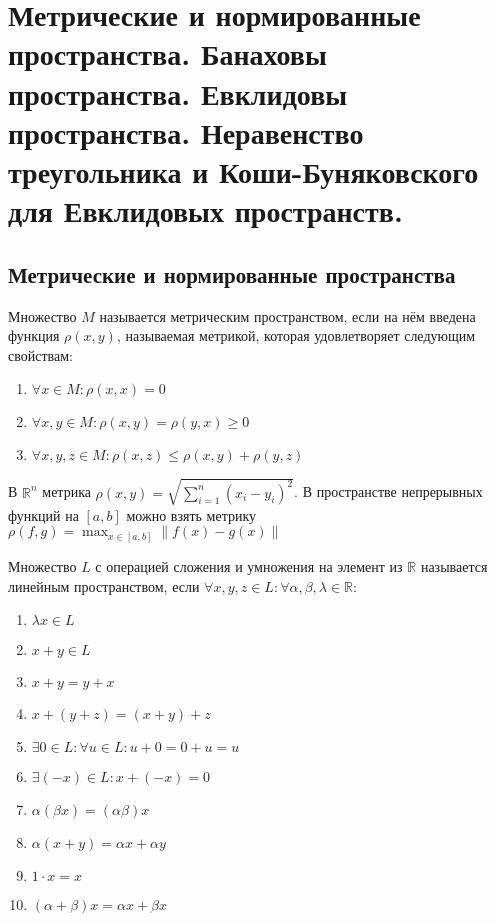 \documentclass[document.tex]{subfiles}
\begin{document}
\section{Метрические и нормированные пространства. Банаховы пространства. Евклидовы пространства. Неравенство
треугольника и Коши-Буняковского для Евклидовых пространств.}

\subsection{Метрические и нормированные пространства}
\begin{definition}
    Множество $M$ называется метрическим пространством, если на нём введена функция $\rho(x, y)$, называемая метрикой,
    которая удовлетворяет следующим свойствам:
    ~\begin{enumerate}
        \item $\forall x \in M: \rho(x, x) = 0$
        \item $\forall x, y \in M: \rho(x, y) = \rho(y, x) \geq 0$
        \item $\forall x, y, z \in M: \rho(x, z) \leq \rho(x, y) + \rho(y, z)$
    \end{enumerate}
\end{definition}

\begin{example}
    В $\mathbb{R}^n$ метрика $\rho(x, y) = \sqrt{\sum_{i = 1}^n (x_i - y_i)^2}$. В пространстве непрерывных функций на
    $[a, b]$ можно взять метрику $\rho(f, g) = \max_{x \in [a, b]} \|f(x) - g(x)\|$
\end{example}

\begin{definition}
    Множество $L$ с операцией сложения и умножения на элемент из $\mathbb{R}$ называется линейным пространством, если
    $\forall x, y, z \in L: \forall \alpha, \beta, \lambda \in \mathbb{R}$: 
    \begin{enumerate}
        \item $\lambda x \in L$
        \item $x + y \in L$
        \item $x + y = y + x$
        \item $x + (y + z) = (x + y) + z$
        \item $\exists 0 \in L : \forall u \in L: u + 0 = 0 + u = u$
        \item $\exists (-x) \in L : x + (-x) = 0$
        \item $\alpha(\beta x) = (\alpha \beta)x$
        \item $\alpha(x + y) = \alpha x + \alpha y$
        \item $1 \cdot x = x$
        \item $(\alpha + \beta)x = \alpha x + \beta x$
    \end{enumerate}
\end{definition}
\end{document}
